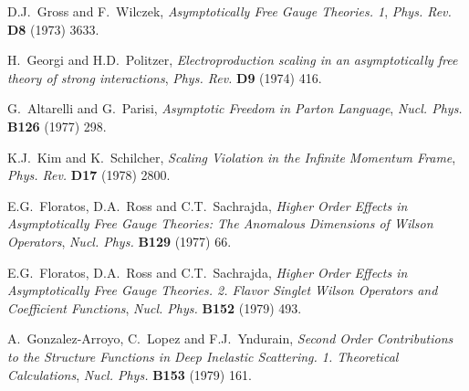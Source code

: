 \documentclass[12pt]{article}
\begin{document}
\bigskip
{\footnotesize

% 
% 

\providecommand{\href}[2]{#2}\begingroup\raggedright\begin{thebibliography}{100}

D.J.~Gross and F.~Wilczek, \emph{{Asymptotically Free Gauge Theories. 1}},
  \href{https://dx.doi.org/10.1103/PhysRevD.8.3633}{\emph{Phys. Rev.} {\bf D8}
  (1973) 3633}.

H.~Georgi and H.D.~Politzer, \emph{{Electroproduction scaling in an
  asymptotically free theory of strong interactions}},
  \href{https://dx.doi.org/10.1103/PhysRevD.9.416}{\emph{Phys. Rev.} {\bf D9}
  (1974) 416}.

G.~Altarelli and G.~Parisi, \emph{{Asymptotic Freedom in Parton Language}},
  \href{https://dx.doi.org/10.1016/0550-3213(77)90384-4}{\emph{Nucl. Phys.}
  {\bf B126} (1977) 298}.

K.J.~Kim and K.~Schilcher, \emph{{Scaling Violation in the Infinite Momentum
  Frame}}, \href{https://dx.doi.org/10.1103/PhysRevD.17.2800}{\emph{Phys. Rev.}
  {\bf D17} (1978) 2800}.

E.G.~Floratos, D.A.~Ross and C.T.~Sachrajda, \emph{{Higher Order Effects in
  Asymptotically Free Gauge Theories: The Anomalous Dimensions of Wilson
  Operators}}, \href{https://dx.doi.org/10.1016/0550-3213(78)90367-X,
  10.1016/0550-3213(77)90020-7}{\emph{Nucl. Phys.} {\bf B129} (1977) 66}.

E.G.~Floratos, D.A.~Ross and C.T.~Sachrajda, \emph{{Higher Order Effects in
  Asymptotically Free Gauge Theories. 2. Flavor Singlet Wilson Operators and
  Coefficient Functions}},
  \href{https://dx.doi.org/10.1016/0550-3213(79)90094-4}{\emph{Nucl. Phys.}
  {\bf B152} (1979) 493}.

A.~Gonzalez-Arroyo, C.~Lopez and F.J.~Yndurain, \emph{{Second Order
  Contributions to the Structure Functions in Deep Inelastic Scattering. 1.
  Theoretical Calculations}},
  \href{https://dx.doi.org/10.1016/0550-3213(79)90596-0,
  10.1016/0550-3213(79)90466-8}{\emph{Nucl. Phys.} {\bf B153} (1979) 161}.


\end{thebibliography}}
\end{document}
